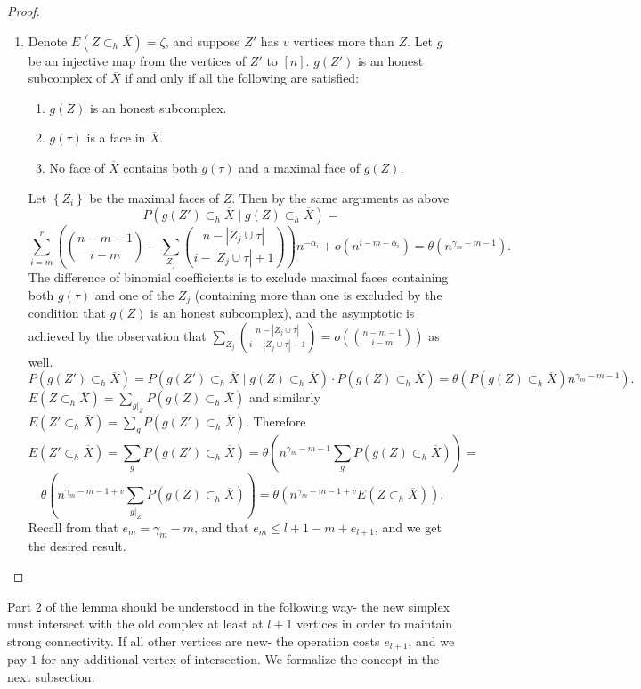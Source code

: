 \documentclass{article}
\newcommand{\prs}[1]{\left( #1 \right)}
\newcommand{\crb}[1]{\left\{ #1 \right\}}
\theoremstyle{plain}
\theoremstyle{definition}
\theoremstyle{remark}
\begin{document}
\begin{proof}
\begin{enumerate}
 But $\gamma_d\le \beta < l+1$, giving the budget.
 \item Denote $E(Z\subset_h\overline{X})=\zeta$, and suppose $Z'$ has $v$ vertices more than $Z$. Let $g$ be an injective map from the vertices of $Z'$ to $[n]$. $g(Z')$ is an honest subcomplex of $\overline{X}$ if and only if all the following are satisfied:
 \begin{enumerate}[label=\alph*)]
     \item $g(Z)$ is an honest subcomplex.
     \item $g(\tau)$ is a face in $\overline{X}$.
     \item No face of $\overline{X}$ contains both $g(\tau)$ and a maximal face of $g(Z)$.
 \end{enumerate}
 Let $\crb{Z_i}$ be the maximal faces of $Z$. Then by the same arguments as above
 $$P\prs{g(Z')\subset_h\overline{X}\mid g(Z)\subset_h\overline{X}}=$$$$\sum_{i=m} ^r \prs{\binom{n-m-1}{i-m}-\sum_{Z_j}\binom{n-|Z_j\cup \tau|}{i-|Z_j\cup \tau|+1}}n^{-\alpha_i}+o(n^{i-m-\alpha_i})=\theta(n^{\gamma_m-m-1}).$$
The difference of binomial coefficients is to exclude maximal faces containing both $g(\tau)$ and one of the $Z_j$ (containing more than one is excluded by the condition that $g(Z)$ is an honest subcomplex), and the asymptotic is achieved by the observation that $\sum_{Z_j}\binom{n-|Z_j\cup \tau|}{i-|Z_j\cup \tau|+1}=o\prs{\binom{n-m-1}{i-m}}$ as well.
$$P(g(Z')\subset_h\overline{X})=P(g(Z')\subset_h\overline{X}\mid g(Z)\subset_h\overline{X})\cdot P(g(Z)\subset_h\overline{X})=\theta\prs{P(g(Z)\subset_h\overline{X})n^{\gamma_m-m-1}}.$$
$E(Z\subset_h\overline{X})=\sum_{g|_Z}P(g(Z)\subset_h\overline{X})$ and similarly $E(Z'\subset_h\overline{X})=\sum_{g}P(g(Z')\subset_h\overline{X})$.
Therefore 
$$E(Z'\subset_h\overline{X})=\sum_{g}P(g(Z')\subset_h\overline{X})=\theta\prs{n^{\gamma_m-m-1}\sum_{g}P(g(Z)\subset_h\overline{X})}=$$
$$\theta\prs{n^{\gamma_m-m-1+v}\sum_{g|_Z}P(g(Z)\subset_h\overline{X})}=\theta\prs{n^{\gamma_m-m-1+v}E(Z\subset_h\overline{X})}.$$
Recall from  that $e_m=\gamma_m-m$, and that $e_m\le l+1-m+e_{l+1}$, and we get the desired result.
    \end{enumerate}
\end{proof}
Part 2 of the lemma should be understood in the following way- the new simplex must intersect with the old complex at least at $l+1$ vertices in order to maintain strong connectivity.
If all other vertices are new- the operation costs $e_{l+1}$, and we pay $1$ for any additional vertex of intersection. We formalize the concept in the next subsection.
\end{document}
